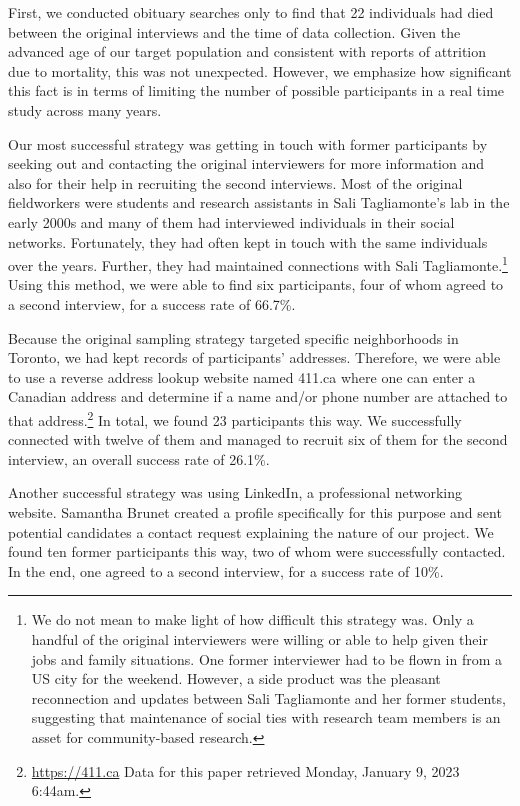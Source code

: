 \documentclass[output=paper]{langscibook}
\begin{document}
First, we conducted obituary searches only to find that 22 individuals had died between the original interviews and the time of data collection. Given the advanced age of our target population and consistent with  reports of attrition due to mortality, this was not unexpected. However, we emphasize how significant this fact is in terms of limiting the number of possible participants in a real time study across many years.



Our most successful strategy was getting in touch with former participants by seeking out and contacting the original interviewers for more information and also for their help in recruiting the second interviews. Most of the original fieldworkers were students and research assistants in Sali Tagliamonte’s lab in the early 2000s and many of them had interviewed individuals in their social networks. Fortunately, they had often kept in touch with the same individuals over the years. Further, they had maintained connections with Sali Tagliamonte.\footnote{We do not mean to make light of how difficult this strategy was. Only a handful of the original interviewers were willing or able to help given their jobs and family situations. One former interviewer had to be flown in from a US city for the weekend. However, a side product was the pleasant reconnection and updates between Sali Tagliamonte and her former students, suggesting that maintenance of social ties with research team members is an asset for community-based research.} Using this method, we were able to find six participants, four of whom agreed to a second interview, for a success rate of 66.7\%.



Because the original sampling strategy targeted specific neighborhoods in Toronto, we had kept records of participants’ addresses. Therefore, we were able to use a reverse address lookup website named 411.ca where one can enter a Canadian address and determine if a name and/or phone number are attached to that address.\footnote{\url{https://411.ca} Data for this paper retrieved  Monday, January 9, 2023 6:44am.} In total, we found 23 participants this way. We successfully connected with twelve of them and managed to recruit six of them for the second interview, an overall success rate of 26.1\%.



Another successful strategy was using LinkedIn, a professional networking website. Samantha Brunet created a profile specifically for this purpose and sent potential candidates a contact request explaining the nature of our project. We found ten former participants this way, two of whom were successfully contacted. In the end, one agreed to a second interview, for a success rate of 10\%.
\end{document}
